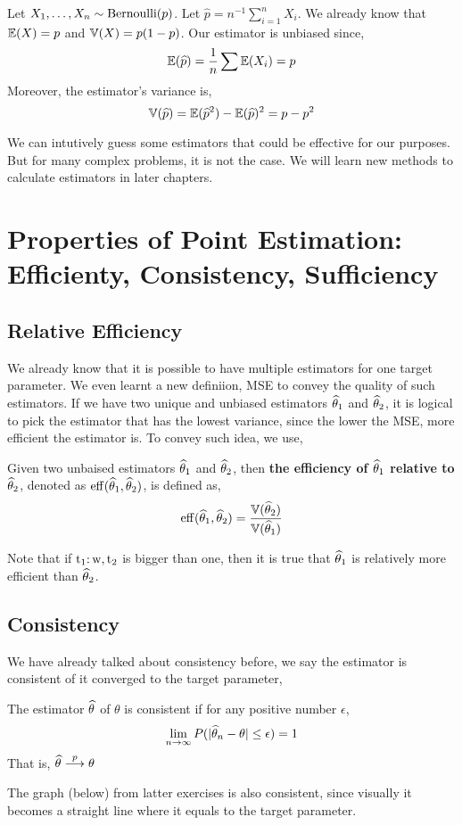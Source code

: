 \begin{example}
    Let $X_1, \ldots ,X_n \sim \operatorname{Bernoulli}(p)$. Let $\widehat{p} = n^{-1}\sum_{i=1}^n X_i$. We already know that ${\mathbb{E}}(X) = p$ and ${\mathbb{V}}(X) = p(1-p)$.  Our estimator is unbiased since,
    \[ {\mathbb{E}}( \widehat{p}) = \frac{1}{n} \sum {\mathbb{E}}(X_i) = p\]
    Moreover, the estimator's variance is, 
    \[ {\mathbb{V}}(\widehat{p}) = {\mathbb{E}}(\widehat{p}^2) - {\mathbb{E}}(\widehat{p})^2 = p - p^2 \]
\end{example}
We can intutively guess some estimators that could be effective for our purposes. But for many complex problems, it is not the case. We will learn new methods to calculate estimators in later chapters.
\section{Properties of Point Estimation: Efficienty, Consistency, Sufficiency}
\subsection*{Relative Efficiency}
We already know that it is possible to have multiple estimators for one target parameter. 
We even learnt a new definiion, MSE to convey the quality of such estimators.
If we have two unique and unbiased estimators ${\widehat{\theta}}_1$ and ${\widehat{\theta}}_2$, it is logical to pick the estimator that has the lowest variance, since the lower the MSE, more efficient the estimator is. To convey such idea, we use, 
\begin{definition}
    Given two unbaised estimators ${\widehat{\theta}}_1$ and ${\widehat{\theta}}_2$, then \textbf{the efficiency of ${\widehat{\theta}}_1$ relative to ${\widehat{\theta}}_2$}, denoted as $\operatorname{eff}({\widehat{\theta}}_1,{\widehat{\theta}}_2)$, is defined as,
    \[ \operatorname{eff}({\widehat{\theta}}_1, {\widehat{\theta}}_2) = \frac{{\mathbb{V}}({\widehat{\theta}}_2)}{{\mathbb{V}}({\widehat{\theta}}_1)} \]

    Note that  if $\operatorname{t_1:w, t_2}$ is bigger than one, then it is true that ${\widehat{\theta}}_1$ is relatively more efficient than ${\widehat{\theta}}_2$.
\end{definition}
\subsection*{Consistency}
We have already talked about consistency before, we say the estimator is consistent of it converged to the target parameter,
\begin{definition}
        The estimator ${\widehat{\theta}}$ of $\theta$ is consistent if for any positive number $\epsilon$,
    \[ \lim_{n \rightarrow \infty} P(| {\widehat{\theta}}_{n} - \theta| \le \epsilon) = 1 \]
        That is, ${\widehat{\theta}} \stackrel{p}{\longrightarrow} \theta$

\end{definition}
The graph (below) from latter exercises is also consistent, since visually it becomes a straight line where it equals to the target parameter.

